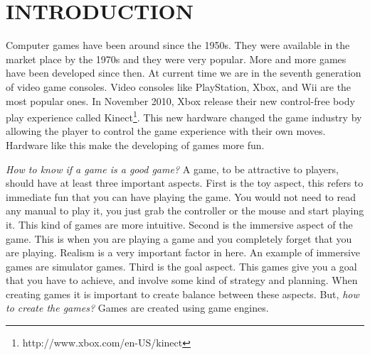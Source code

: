 \chapter{INTRODUCTION}








Computer games have been around since the 1950s\cite{computerVideoGamesHistory}. They were available in the market place by the 1970s and they were very popular. More and more games have been developed since then. At current time we are in the seventh generation of video game consoles\cite{seventhGenerationGames}. Video consoles like PlayStation, Xbox, and Wii are the most popular ones. In November 2010, Xbox release their new control-free body play experience called Kinect\footnote{http://www.xbox.com/en-US/kinect}. This new hardware changed the game industry by allowing the player to control the game experience with their own moves. Hardware like this make the developing of games more fun. 

\textit{How to know if a game is a good game?} A game, to be attractive to players, should have at least three important aspects\cite{bookGameKit2}. First is the toy aspect, this refers to immediate fun that you can have playing the game. You would not need to read any manual to play it, you just grab the controller or the mouse and start playing it. This kind of games are more intuitive. Second is the immersive aspect of the game. This is when you are playing a game and you completely forget that you are playing. Realism is a very important factor in here. An example of immersive games are simulator games. Third is the goal aspect. This games give you a goal that you have to achieve, and involve some kind of strategy and planning. When creating games it is important to create balance between these aspects. But, \textit{how to create the games?} Games are created using game engines.

